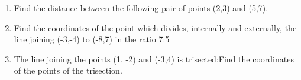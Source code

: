 \renewcommand{\theequation}{\theenumi}
\renewcommand{\thefigure}{\theenumi}
\begin{enumerate}[label=\thesubsection.\arabic*.,ref=\thesubsection.\theenumi]

\item Find the distance between the following pair of points (2,3) and (5,7). 
\\
\solution
%

\item Find the coordinates of the point which divides, internally and externally, the line joining (-3,-4) to (-8,7) in the ratio 7:5
\\
\solution
 
%
\item The line joining the points (1, -2) and (-3,4) is  trisected;Find the coordinates of the points of the trisection.
\\
\solution
 



% 

\end{enumerate}
